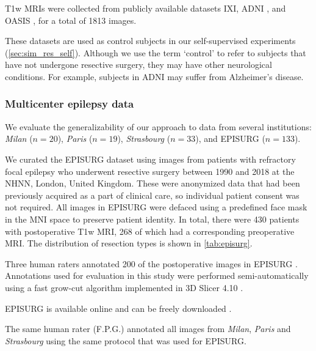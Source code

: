 \ac{T1w} \acp{MRI} were collected from publicly available datasets \ac{IXI}, \ac{ADNI} \cite{jack_alzheimers_2008}, and \ac{OASIS} \cite{lamontagne_oasis-3_2019}, for a total of 1813 images.

These datasets are used as control subjects in our self-supervised experiments (\cref{sec:sim_res_self}).
Although we use the term `control' to refer to subjects that have not undergone resective surgery, they may have other neurological conditions.
For example, subjects in \ac{ADNI} may suffer from Alzheimer's disease.


\subsubsection{Multicenter epilepsy data}
\label{sec:multicenter}

We evaluate the generalizability of our approach to data from several institutions: \textit{Milan} ($n = 20$), \textit{Paris} ($n = 19$), \textit{Strasbourg} ($n = 33$), and EPISURG ($n = 133$).

We curated the EPISURG dataset using images from patients with refractory focal epilepsy who underwent resective surgery between 1990 and 2018 at the \ac{NHNN}, London, United Kingdom.
These were anonymized data that had been previously acquired as a part of clinical care, so individual patient consent was not required.
All images in EPISURG were defaced using a predefined face mask in the \ac{MNI} space to preserve patient identity.
In total, there were 430 patients with postoperative \ac{T1w} \ac{MRI}, 268 of which had a corresponding preoperative \ac{MRI}.
The distribution of resection types is shown in \cref{tab:episurg}.

Three human raters annotated 200 of the postoperative images in EPISURG \cite{perez-garcia_simulation_2020}.
Annotations used for evaluation in this study were performed semi-automatically using a fast grow-cut algorithm implemented in 3D Slicer 4.10 \cite{zhu_effective_2014,fedorov_3d_2012}.

EPISURG is available online and can be freely downloaded \cite{perez-garcia_episurg_2020}%
.

The same human rater (F.P.G.) annotated all images from \textit{Milan}, \textit{Paris} and \textit{Strasbourg} using the same protocol that was used for EPISURG.






